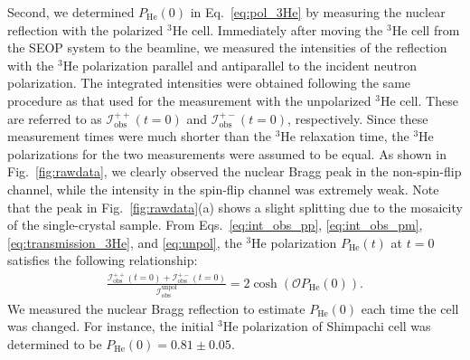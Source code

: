 \documentclass[%
 reprint,
superscriptaddress,
 amsmath,amssymb,
 aps,
floatfix,
]{revtex4-2}
\newcommand{\He}{$^3$He }
\begin{document}
Second, we determined $P_\mathrm{He}(0)$ in Eq.~\ref{eq:pol_3He} by measuring the nuclear reflection with the polarized \He cell.
Immediately after moving the \He cell from the SEOP system to the beamline, we measured the intensities of the reflection with the \He polarization parallel and antiparallel to the incident neutron polarization.
The integrated intensities were obtained following the same procedure as that used for the measurement with the unpolarized \He cell.
These are referred to as $\mathcal{I}^\mathrm{++}_\mathrm{obs}(t=0)$ and $\mathcal{I}^\mathrm{+-}_\mathrm{obs}(t=0)$, respectively.
Since these measurement times were much shorter than the \He relaxation time, the \He polarizations for the two measurements were assumed to be equal.
As shown in Fig.~\ref{fig:rawdata}, we clearly observed the nuclear Bragg peak in the non-spin-flip channel, while the intensity in the spin-flip channel was extremely weak.
Note that the peak in Fig.~\ref{fig:rawdata}(a) shows a slight splitting due to the mosaicity of the single-crystal sample.
From Eqs.~\ref{eq:int_obs_pp}, \ref{eq:int_obs_pm}, \ref{eq:transmission_3He}, and \ref{eq:unpol}, the \He polarization $P_\mathrm{He}(t)$ at $t=0$ satisfies the following relationship:
\begin{align}
    \frac{\mathcal{I}^{++}_\mathrm{obs}(t=0)+\mathcal{I}^{+-}_\mathrm{obs}(t=0)}{\mathcal{I}^\mathrm{unpol}_\mathrm{obs}} = 2\cosh(\mathcal{O}P_\mathrm{He}(0)).
    \label{eq:transmission_ratio}
\end{align}
We measured the nuclear Bragg reflection to estimate $P_\mathrm{He}(0)$ each time the cell was changed.
For instance, the initial \He polarization of Shimpachi cell was determined to be $P_\mathrm{He}(0)=0.81\pm0.05$.
\end{document}
